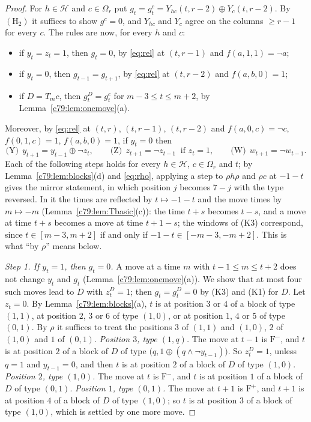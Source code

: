 \begin{proof}
For $h\in\mathcal H$ and $c\in\Omega_r$ put $g_t=g^c_t=Y_{hc}(t,r-2)\oplus Y_c(t,r-2)$. By $(\mathrm H_2)$ it suffices to show $g^c=0$, and $Y_{hc}$ and $Y_c$ agree on the columns $\ge r-1$ for every $c$. The rules are now, for every $h$ and $c$:
\begin{itemize}
\item[(K1)] if $y_t=z_t=1$, then $g_t=0$, by \eqref{eq:rel} at $(t,r-1)$ and $f(a,1,1)=\neg a$;
\item[(K2)] if $y_t=0$, then $g_{t-1}=g_{t+1}$, by \eqref{eq:rel} at $(t,r-2)$ and $f(a,b,0)=1$;
\item[(K3)] if $D=T_mc$, then $g^D_t=g^c_t$ for $m-3\le t\le m+2$, by Lemma~\ref{c79:lem:onemove}(a).
\end{itemize}
Moreover, by \eqref{eq:rel} at $(t,r)$, $(t,r-1)$, $(t,r-2)$ and $f(a,0,c)=\neg c$, $f(0,1,c)=1$, $f(a,b,0)=1$, if $y_t=0$ then
\[
\text{(Y)}\ \ y_{t+1}=y_{t-1}\oplus\neg z_t,\qquad \text{(Z)}\ \ z_{t+1}=\neg z_{t-1}\ \text{ if } z_t=1,\qquad \text{(W)}\ \ w_{t+1}=\neg w_{t-1}.
\]
Each of the following steps holds for every $h\in\mathcal H$, $c\in\Omega_r$ and $t$; by Lemma~\ref{c79:lem:blocks}(d) and \eqref{eq:rho}, applying a step to $\rho h\rho$ and $\rho c$ at $-1-t$ gives the mirror statement, in which position $j$ becomes $7-j$ with the type reversed. In it the times are reflected by $t\mapsto-1-t$ and the move times by $m\mapsto-m$ (Lemma~\ref{c79:lem:Tbasic}(c)): the time $t+s$ becomes $t-s$, and a move at time $t+s$ becomes a move at time $t+1-s$; the windows of (K3) correspond, since $t\in[m-3,m+2]$ if and only if $-1-t\in[-m-3,-m+2]$. This is what ``by $\rho$'' means below.

\emph{Step 1. If $y_t=1$, then $g_t=0$.} A move at a time $m$ with $t-1\le m\le t+2$ does not change $y_t$ and $g_t$ (Lemma~\ref{c79:lem:onemove}(a)). We show that at most four such moves lead to $D$ with $z^D_t=1$; then $g_t=g^D_t=0$ by (K3) and (K1) for $D$. Let $z_t=0$. By Lemma~\ref{c79:lem:blocks}(a), $t$ is at position $3$ or $4$ of a block of type $(1,1)$, at position $2$, $3$ or $6$ of type $(1,0)$, or at position $1$, $4$ or $5$ of type $(0,1)$. By $\rho$ it suffices to treat the positions $3$ of $(1,1)$ and $(1,0)$, $2$ of $(1,0)$ and $1$ of $(0,1)$.
\emph{Position $3$, type $(1,q)$.} The move at $t-1$ is $\mathrm F^-$, and $t$ is at position $2$ of a block of $D$ of type $\bigl(q,1\oplus(q\wedge\neg y_{t-1})\bigr)$. So $z^D_t=1$, unless $q=1$ and $y_{t-1}=0$, and then $t$ is at position $2$ of a block of $D$ of type $(1,0)$.
\emph{Position $2$, type $(1,0)$.} The move at $t$ is $\mathrm F^-$, and $t$ is at position $1$ of a block of $D$ of type $(0,1)$.
\emph{Position $1$, type $(0,1)$.} The move at $t+1$ is $\mathrm F^+$, and $t+1$ is at position $4$ of a block of $D$ of type $(1,0)$; so $t$ is at position $3$ of a block of type $(1,0)$, which is settled by one more move.


\end{proof}
